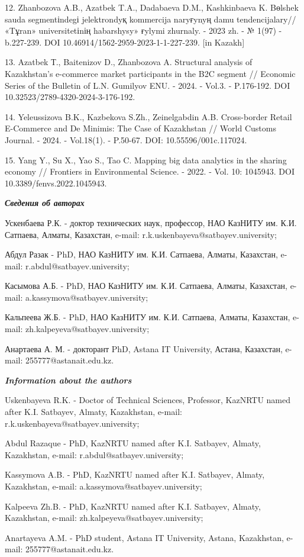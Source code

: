 \begin{refs}
12. Zhanbozova A.B., Azatbek T.A., Dadabaeva D.M., Kashkinbaeva K.
Bөlshek sauda segmentіndegі jelektrondyқ kommercija naryғynyң damu
tendencijalary// «Tұran» universitetіnің habarshysy» ғylymi zhurnaly. -
2023 zh. - № 1(97) - b.227-239. DOI 10.46914/1562-2959-2023-1-1-227-239.
{[}in Kazakh{]}

13. Azatbek Т., Baitenizov D., Zhanbozova A. Structural analysis of
Kazakhstan's e-commerce market participants in the B2C segment //
Economic Series of the Bulletin of L.N. Gumilyov ENU. - 2024. - Vol.3.
- P.176-192. DOI 10.32523/2789-4320-2024-3-176-192.

14. Yeleussizova B.K., Kazbekova S.Zh., Zeinelgabdin A.B. Cross-border
Retail E-Commerce and De Minimis: The Case of Kazakhstan // World
Customs Journal. - 2024. - Vol.18(1). - P.50-67. DOI:
10.55596/001c.117024.

15. Yang Y., Su X., Yao S., Tao C. Mapping big data analytics in the
sharing economy // Frontiers in Environmental Science. - 2022. - Vol.
10: 1045943. DOI 10.3389/fenvs.2022.1045943.
\end{refs}

\begin{info}
\hspace{1em}\emph{{\bfseries Сведения об авторах}}

Ускенбаева Р.К. - доктор технических наук, профессор, НАО КазНИТУ им.
К.И. Сатпаева, Алматы, Казахстан, e-mail:
r.k.uskenbayeva@satbayev.university;

Абдул Разак - PhD, НАО КазНИТУ им. К.И. Сатпаева, Алматы, Казахстан,
e-mail:
r.abdul@satbayev.university;

Касымова А.Б. - PhD, НАО КазНИТУ им. К.И. Сатпаева, Алматы, Казахстан,
e-mail:
a.kassymova@satbayev.university;

Кальпеева Ж.Б. - PhD, НАО КазНИТУ им. К.И. Сатпаева, Алматы, Казахстан,
e-mail: zh.kalpeyeva@satbayev.university;

Анартаева А. М. - докторант PhD, Astana IT University, Астана,
Казахстан, e-mail: 255777@astanait.edu.kz.

\hspace{1em}\emph{{\bfseries Information about the authors}}

Uskenbayeva R.K. - Doctor of Technical Sciences, Professor, KazNRTU
named after K.I. Satbayev, Almaty, Kazakhstan, e-mail:
r.k.uskenbayeva@satbayev.university;

Abdul Razaque - PhD, KazNRTU named after K.I. Satbayev, Almaty,
Kazakhstan, e-mail:
r.abdul@satbayev.university;

Kassymova A.B. - PhD, KazNRTU named after K.I. Satbayev, Almaty,
Kazakhstan, e-mail:
a.kassymova@satbayev.university;

Kalpeeva Zh.B. - PhD, KazNRTU named after K.I. Satbayev, Almaty,
Kazakhstan, e-mail: zh.kalpeyeva@satbayev.university;

Anartayeva A.M. - PhD student, Astana IT University, Astana, Kazakhstan,
e-mail: 255777@astanait.edu.kz.
\end{info}
